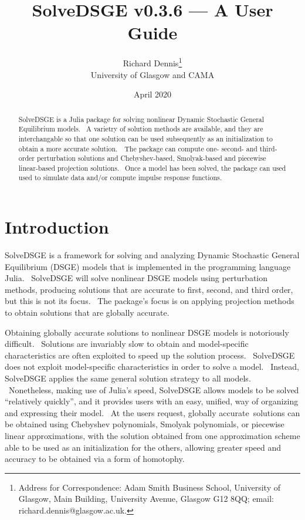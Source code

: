 \documentclass[notitlepage,11pt]{article}
\begin{document}
\author{Richard Dennis\thanks{%
Address for Correspondence: Adam Smith Business School, University of
Glasgow, Main Building, University Avenue, Glasgow G12 8QQ; email:
richard.dennis@glasgow.ac.uk.} \\
University of Glasgow and CAMA}
\title{SolveDSGE v0.3.6 --- A User Guide}
\date{April 2020}
\maketitle

\begin{abstract}
SolveDSGE is a Julia package for solving nonlinear Dynamic Stochastic
General Equilibrium models. \ A varietry of solution methods are available,
and they are interchangable so that one solution can be used subsequently as
an initialization to obtain a more accurate solution.\noindent\ \ The
package can compute one- second- and third-order perturbation solutions and
Chebyshev-based, Smolyak-based and piecewise linear-based projection
solutions. \ Once a model has been solved, the package can used used to
simulate data and/or compute impulse response functions.

\vspace{0.12in}
\end{abstract}

\thispagestyle{empty}\newpage \setlength{\baselineskip}{18.95pt}%
\setcounter{page}{1}

\section{Introduction}

SolveDSGE is a framework for solving and analyzing Dynamic Stochastic
General Equilibrium (DSGE) models that is implemented in the programming
language Julia. \ SolveDSGE will solve nonlinear DSGE models using
perturbation methods, producing solutions that are accurate to first,
second, and third order, but this is not its focus. \ The package's focus is
on applying projection methods to obtain solutions that are globally
accurate.

Obtaining globally accurate solutions to nonlinear DSGE models is
notoriously difficult. \ Solutions are invariably slow to obtain and
model-specific characteristics are often exploited to speed up the solution
process. \ SolveDSGE does not exploit model-specific characteristics in
order to solve a model. \ Instead, SolveDSGE applies the same general
solution strategy to all models. \ Nonetheless, making use of Julia's speed,
SolveDSGE allows models to be solved \textquotedblleft relatively
quickly\textquotedblright , and it provides users with an easy, unified, way
of organizing and expressing their model. \ At the users request, globally
accurate\ solutions can be obtained using Chebyshev polynomials, Smolyak
polynomials, or piecewise linear approximations, with the solution obtained
from one approximation scheme able to be used as an initialization for the
others, allowing greater speed and accuracy to be obtained via a form of
homotophy.
\end{document}
